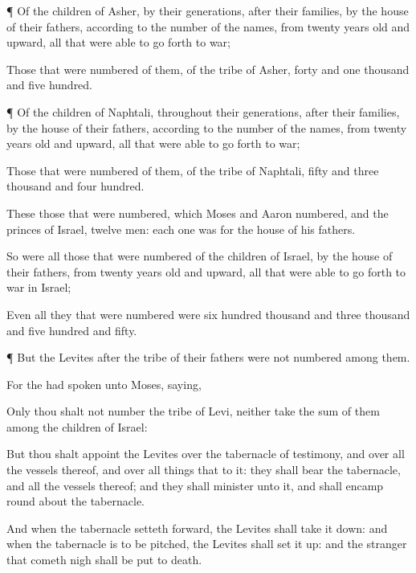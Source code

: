 {\par }{\PP {}¶ Of the
children of
Asher, by their
generations, after their
families, by the
house of their
fathers, according to the
number of the
names, from
twenty
years
old and
upward, all that were able to go
forth to
war;

Those that were
numbered of them,
{} of the
tribe of
Asher,
{}
forty and
one
thousand and
five
hundred.


\par }{\PP {}¶ Of the
children of
Naphtali, throughout their
generations, after their
families, by the
house of their
fathers, according to the
number of the
names, from
twenty
years
old and
upward, all that were able to go
forth to
war;

Those that were
numbered of them,
{} of the
tribe of
Naphtali,
{}
fifty and
three
thousand and
four
hundred.


\par }{\PP {}These
{} those that were
numbered, which
Moses and
Aaron
numbered, and the
princes of
Israel,
{}
twelve
men:
each
one was for the
house of his
fathers.

So were all those that were
numbered of the
children of
Israel, by the
house of their
fathers, from
twenty
years
old and
upward, all that were able to go
forth to
war in
Israel;

Even all they that were
numbered were
six
hundred
thousand and
three
thousand and
five
hundred and
fifty.


\par }{\PP {}¶ But the
Levites after the
tribe of their
fathers were not
numbered
among them.

For the
{} had
spoken unto
Moses,
saying,

Only thou shalt not
number the
tribe of
Levi, neither
take the
sum of them
among the
children of
Israel:

But thou shalt
appoint the
Levites over the
tabernacle of
testimony, and over all the
vessels thereof, and over all things that
{} to it: they shall
bear the
tabernacle, and all the
vessels thereof; and they shall
minister unto it, and shall
encamp round
about the
tabernacle.

And when the
tabernacle setteth
forward, the
Levites shall take it
down: and when the
tabernacle is to be
pitched, the
Levites shall set it
up: and the
stranger that cometh
nigh shall be put to
death.

}
